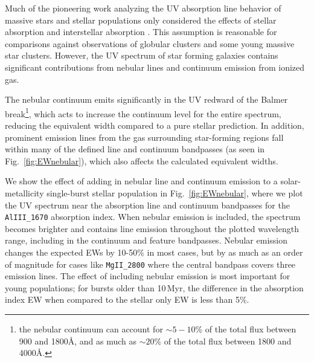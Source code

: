 \documentclass[preprint2]{aastex61}
\newcommand{\Myr}{$\,$Myr\xspace}
\newcommand{\ang}{\ensuremath{\mbox{\AA}}\xspace}
\begin{document}

Much of the pioneering work analyzing the UV absorption line behavior of massive stars and stellar populations only considered the effects of stellar absorption and interstellar absorption \citep[e.g.,][]{Rix+2004, Maraston+2009, Leitherer+2011,Zetterlund+2015}. This assumption is reasonable for comparisons against observations of globular clusters and some young massive star clusters. However, the UV spectrum of star forming galaxies contains significant contributions from nebular lines and continuum emission from ionized gas. 

The nebular continuum emits significantly in the UV redward of the Balmer break\footnote{\citet{Byler+2016} the nebular continuum can account for $\sim5-10\%$ of the total flux between 900 and 1800\ang, and as much as $\sim20\%$ of the total flux between 1800 and 4000\ang.}, which acts to increase the continuum level for the entire spectrum, reducing the equivalent width compared to a pure stellar prediction. In addition, prominent emission lines from the gas surrounding star-forming regions fall within many of the defined line and continuum bandpasses (as seen in Fig.~\ref{fig:EWnebular}), which also affects the calculated equivalent widths.

We show the effect of adding in nebular line and continuum emission to a solar-metallicity single-burst stellar population in Fig.~\ref{fig:EWnebular}, where we plot the UV spectrum near the absorption line and continuum bandpasses for the {\tt AlIII\_1670} \citet{Leitherer+2011} absorption index. When nebular emission is included, the spectrum becomes brighter and contains line emission throughout the plotted wavelength range, including in the continuum and feature bandpasses. Nebular emission changes the expected EWs by 10-50\% in most cases, but by as much as an order of magnitude for cases like \texttt{MgII\_2800} where the central bandpass covers three emission lines. The effect of including nebular emission is most important for young populations; for bursts older than 10\Myr, the difference in the absorption index EW when compared to the stellar only EW is less than 5\%.
\end{document}
